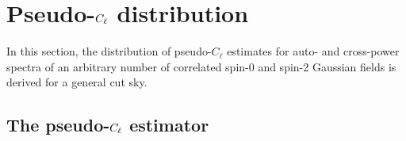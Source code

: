 \section{Pseudo-\texorpdfstring{$C_\ell$}{Cl} distribution}
\label{el_Sec:pcl_dist}

In this section, the distribution of pseudo-$C_\ell$ estimates for auto- and cross-power spectra of an arbitrary number of correlated spin-0 and spin-2 Gaussian fields is derived for a general cut sky.

\subsection{The pseudo-\texorpdfstring{$C_\ell$}{Cl} estimator}

